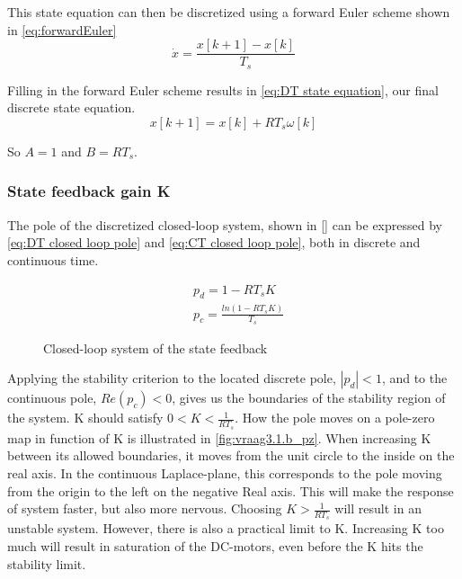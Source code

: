 \documentclass[a4paper]{article}
\newcommand{\newpar}{\vspace{.3cm}\noindent}
\begin{document}
\newpar 
This state equation can then be discretized using a forward Euler scheme shown in \autoref{eq:forwardEuler}
    \begin{equation}
        \dot{x} = \frac{x[k+1] - x[k]}{T_s}
        \label{eq:forwardEuler}
    \end{equation}

\newar
Filling in the forward Euler scheme results in \autoref{eq:DT state equation}, our final discrete state equation.
    \begin{equation}
        x[k+1] = x[k] + RT_s\omega[k]
        \label{eq:DT state equation}
    \end{equation}

\newar
So $A=1$ and $B=RT_s$. 

\subsubsection{State feedback gain K} \label{subsec:gain K}
The pole of the discretized closed-loop system, shown in \autoref{} can be expressed by \autoref{eq:DT closed loop pole} and \ref{eq:CT closed loop pole}, both in discrete and continuous time. 

    \begin{align}
        \label{eq:DT closed loop pole}
        & p_d = 1-RT_sK \\
        \label{eq:CT closed loop pole}
        & p_c = \frac{ln(1-RT_sK)}{T_s}
    \end{align}

\begin{figure}[H]
    \caption{Closed-loop system of the state feedback}
    \label{fig:vraag3.1.b feedback}
\end{figure}

\newpar
Applying the stability criterion to the located discrete pole, $|p_d| < 1$, and to the continuous pole, $Re(p_c) < 0$, gives us the boundaries of the stability region of the system. K should satisfy $0<K<\frac{1}{RT_s}$. How the pole moves on a pole-zero map in function of K is illustrated in \autoref{fig:vraag3.1.b_pz}. When increasing K between its allowed boundaries, it moves from the unit circle to the inside on the real axis. In the continuous Laplace-plane, this corresponds to the pole moving from the origin to the left on the negative Real axis. This will make the response of system faster, but also more nervous.  Choosing $K>\frac{1}{RT_s}$ will result in an unstable system. However, there is also a practical limit to K. Increasing K too much will result in saturation of the DC-motors, even before the K hits the stability limit.
\end{document}

